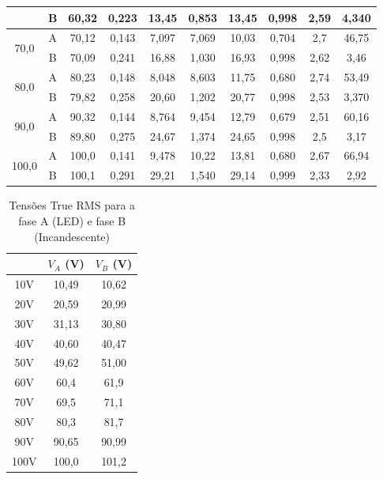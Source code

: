 \documentclass[a4paper,12pt,oneside,openany,table,xcdraw]{article}
\begin{document}
\begin{table}[H]
{\begin{tabular}{|c|c|c|c|c|c|c|c|c|c|}
 & B & 60,32 & 0,223 & 13,45 & 0,853 & 13,45 & 0,998 & 2,59 & 4,340 \\ \hline
\multirow{2}{*}{70,0} & A & 70,12 & 0,143 & 7,097 & 7,069 & 10,03 & 0,704 & 2,7 & 46,75\\ \cline{2-10} 
 & B & 70,09 & 0,241 & 16,88 & 1,030 & 16,93 & 0,998 & 2,62 & 3,46 \\ \hline
\multirow{2}{*}{80,0} & A &  80,23 & 0,148 & 8,048 & 8,603 & 11,75 & 0,680 & 2,74 & 53,49 \\ \cline{2-10} 
 & B &  79,82 & 0,258 & 20,60 & 1,202 & 20,77 & 0,998 & 2,53 & 3,370\\ \hline
\multirow{2}{*}{90,0} & A & 90,32 & 0,144 & 8,764 & 9,454 & 12,79 & 0,679 & 2,51 & 60,16\\ \cline{2-10} 
 & B &  89,80 & 0,275 & 24,67 & 1,374 & 24,65 & 0,998 & 2,5 & 3,17 \\ \hline
\multirow{2}{*}{100,0} & A &  100,0 & 0,141 & 9,478 & 10,22 & 13,81 & 0,680 & 2,67 & 66,94 \\ \cline{2-10} 
 & B & 100,1 & 0,291 & 29,21 & 1,540 & 29,14 & 0,999 & 2,33 & 2,92\\ \hline
\end{tabular}%
}
\end{table}
\vspace{0.3cm}

\begin{table}[H]
\centering \small {}
\caption{Tensões True RMS para a fase A (LED) e fase B (Incandescente)}
\label{m1:dados:truerms}
\begin{tabular}{c|c|c|}
\cline{2-3}
 & $V_A$ (V) & $V_B$ (V) \\ \hline
\multicolumn{1}{|c|}{10V} & 10,49 & 10,62 \\ \hline
\multicolumn{1}{|c|}{20V} & 20,59 & 20,99 \\ \hline
\multicolumn{1}{|c|}{30V} & 31,13 & 30,80 \\ \hline
\multicolumn{1}{|c|}{40V} & 40,60 & 40,47 \\ \hline
\multicolumn{1}{|c|}{50V} & 49,62 & 51,00 \\ \hline
\multicolumn{1}{|c|}{60V} & 60,4 & 61,9 \\ \hline
\multicolumn{1}{|c|}{70V} & 69,5 & 71,1 \\ \hline
\multicolumn{1}{|c|}{80V} & 80,3 & 81,7 \\ \hline
\multicolumn{1}{|c|}{90V} & 90,65 & 90,99 \\ \hline
\multicolumn{1}{|c|}{100V} & 100,0 & 101,2 \\ \hline
\end{tabular}
\end{table}
\vspace{0.4cm}
\end{document}
